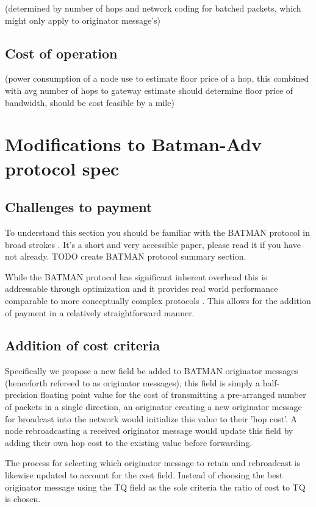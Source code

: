 \documentclass[11pt]{article}
\begin{document}
    (determined by number of hops and network coding for batched packets, which might only apply to originator message's)

    \subsection{Cost of operation}

    (power consumption of a node use to estimate floor price of a hop, this combined with avg number of hops to gateway estimate should determine floor price of bandwidth, should be cost feasible by a mile)

\section{Modifications to Batman-Adv protocol spec}

	\subsection{Challenges to payment}

	To understand this section you should be familiar with the BATMAN protocol in broad strokes \cite{batman}. It's a short and very accessible paper, please read it if you have not already. TODO create BATMAN protocol summary section.

	While the BATMAN protocol has significant inherent overhead this is addressable through optimization \cite{catwoman, batroam} and it provides real world performance comparable to more conceptually complex protocols \cite{meshperf}. This allows for the addition of payment in a relatively straightforward manner.

	\subsection{Addition of cost criteria}

		Specifically we propose a new field be added to BATMAN originator messages (henceforth refereed to as originator messages), this field is simply a half-precision floating point value for the cost of transmitting a pre-arranged number of packets in a single direction, an originator creating a new originator message for broadcast into the network would initialize this value to their 'hop cost'. A node rebroadcasting a received originator message would update this field by adding their own hop cost to the existing value before forwarding.

	        The process for selecting which originator message to retain and rebroadcast is likewise updated to account for the cost field. Instead of choosing the best originator message using the TQ field as the sole criteria the ratio of cost to TQ is chosen.
\end{document}
